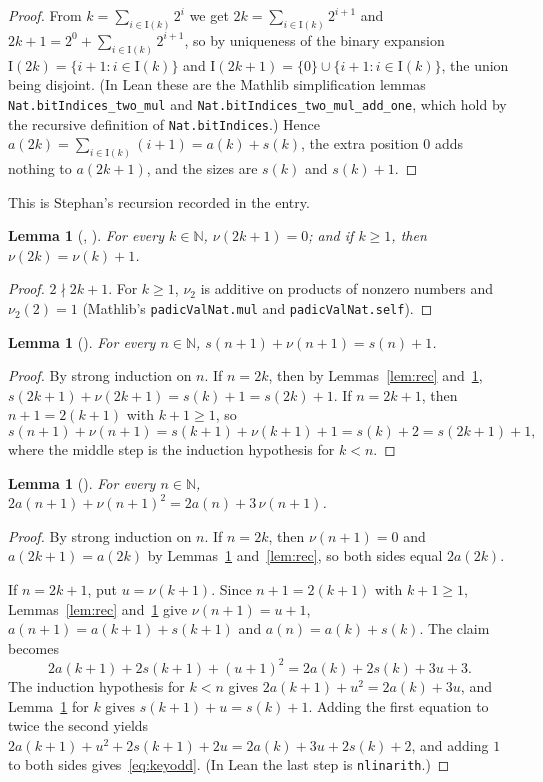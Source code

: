 \documentclass[11pt]{amsart}
\theoremstyle{plain}
\newtheorem{lemma}[theorem]{Lemma}
\theoremstyle{definition}
\newcommand{\N}{\mathbb{N}}
\newcommand{\vt}{\nu_2}
\newcommand{\Bits}{\mathrm{I}}
\begin{document}
\begin{proof}
From $k=\sum_{i\in\Bits(k)}2^i$ we get $2k=\sum_{i\in\Bits(k)}2^{i+1}$ and $2k+1=2^0+\sum_{i\in\Bits(k)}2^{i+1}$, so by uniqueness of the binary expansion $\Bits(2k)=\{i+1:i\in\Bits(k)\}$ and $\Bits(2k+1)=\{0\}\cup\{i+1:i\in\Bits(k)\}$, the union being disjoint. (In Lean these are the Mathlib simplification lemmas \texttt{Nat.bitIndices\_two\_mul} and \texttt{Nat.bitIndices\_two\_mul\_add\_one}, which hold by the recursive definition of \texttt{Nat.bitIndices}.) Hence $a(2k)=\sum_{i\in\Bits(k)}(i+1)=a(k)+s(k)$, the extra position $0$ adds nothing to $a(2k+1)$, and the sizes are $s(k)$ and $s(k)+1$.
\end{proof}

This is Stephan's recursion recorded in the entry.

\begin{lemma}[, ]\label{lem:val}
For every $k\in\N$, $\nu(2k+1)=0$; and if $k\ge1$, then $\nu(2k)=\nu(k)+1$.
\end{lemma}

\begin{proof}
$2\nmid 2k+1$. For $k\ge1$, $\vt$ is additive on products of nonzero numbers and $\vt(2)=1$ (Mathlib's \texttt{padicValNat.mul} and \texttt{padicValNat.self}).
\end{proof}

\begin{lemma}[]\label{lem:pop}
For every $n\in\N$, $s(n+1)+\nu(n+1)=s(n)+1$.
\end{lemma}

\begin{proof}
By strong induction on $n$. If $n=2k$, then by Lemmas~\ref{lem:rec} and~\ref{lem:val}, $s(2k+1)+\nu(2k+1)=s(k)+1=s(2k)+1$. If $n=2k+1$, then $n+1=2(k+1)$ with $k+1\ge1$, so
\[
  s(n+1)+\nu(n+1)=s(k+1)+\nu(k+1)+1=s(k)+2=s(2k+1)+1,
\]
where the middle step is the induction hypothesis for $k<n$.
\end{proof}

\begin{lemma}[]\label{lem:key}
For every $n\in\N$, $2a(n+1)+\nu(n+1)^2=2a(n)+3\,\nu(n+1)$.
\end{lemma}

\begin{proof}
By strong induction on $n$. If $n=2k$, then $\nu(n+1)=0$ and $a(2k+1)=a(2k)$ by Lemmas~\ref{lem:val} and~\ref{lem:rec}, so both sides equal $2a(2k)$.

If $n=2k+1$, put $u=\nu(k+1)$. Since $n+1=2(k+1)$ with $k+1\ge1$, Lemmas~\ref{lem:rec} and~\ref{lem:val} give $\nu(n+1)=u+1$, $a(n+1)=a(k+1)+s(k+1)$ and $a(n)=a(k)+s(k)$. The claim becomes
\begin{equation}\label{eq:keyodd}
  2a(k+1)+2s(k+1)+(u+1)^2 = 2a(k)+2s(k)+3u+3 .
\end{equation}
The induction hypothesis for $k<n$ gives $2a(k+1)+u^2=2a(k)+3u$, and Lemma~\ref{lem:pop} for $k$ gives $s(k+1)+u=s(k)+1$. Adding the first equation to twice the second yields $2a(k+1)+u^2+2s(k+1)+2u=2a(k)+3u+2s(k)+2$, and adding $1$ to both sides gives~\eqref{eq:keyodd}. (In Lean the last step is \texttt{nlinarith}.)
\end{proof}
\end{document}

